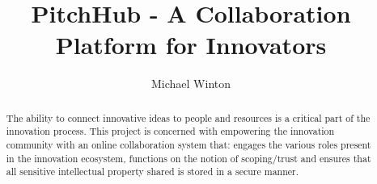 \documentclass[11pt
              , a4paper
              , twoside
              , openright
              ]{report}
\title{PitchHub - A Collaboration Platform for Innovators}
\author{Michael Winton}
\date{}
\begin{document}
\frontmatter



\begin{abstract}

The ability to connect innovative ideas to people and resources is a critical part of the innovation process. This project is concerned with empowering the innovation community with an online collaboration system that: engages the various roles present in the innovation ecosystem, functions on the notion of scoping/trust and ensures that all sensitive intellectual property shared is stored in a secure manner. 

\end{abstract}


\maketitle

% 

\tableofcontents



\mainmatter














% 
% 


\backmatter





\end{document}

